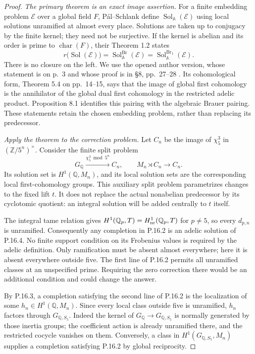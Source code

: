 \begin{proof}
\emph{The primary theorem is an exact image assertion.}
For a finite embedding problem $\mathcal E$ over a global field
$F$, P\'al--Schlank define $\operatorname{Sol}_{\mathbb A}(\mathcal E)$
using local solutions unramified at almost every place.
Solutions are taken up to conjugacy by the finite kernel; they
need not be surjective. If the kernel is abelian and its order
is prime to $\operatorname{char}(F)$, their Theorem 1.2 states
\[
 r\bigl(\operatorname{Sol}(\mathcal E)\bigr)
  =\operatorname{Sol}_{\mathbb A}^{\operatorname{Br}}(\mathcal E)
  =\operatorname{Sol}_{\mathbb A}^{\operatorname{Br}_1}(\mathcal E).
 \tag{P.16.3}
\]
There is no closure on the left. We use the opened author
version, whose statement is on p.~3 and whose proof is in
\S8, pp.~27--28
\citep[Theorem 1.2; \S1, pp.~1--3; \S8, pp.~27--28]{LitPalSchlank2022}.
Its cohomological form, Theorem 5.4 on pp.~14--15, says that
the image of global first cohomology is the annihilator of the
global dual first cohomology in the restricted adelic product.
Proposition 8.1 identifies this pairing with the algebraic
Brauer pairing. These statements retain the chosen embedding
problem, rather than replacing its predecessor.

\emph{Apply the theorem to the correction problem.}
Let $C_n$ be the image of $\chi_5^3$ in
$(\mathbb Z/5^n)^\times$. Consider the finite split problem
\[
 G_{\mathbb Q}\xrightarrow{\chi_5^3\bmod5^n}C_n,\qquad
 M_n\rtimes C_n\longrightarrow C_n .
 \tag{P.16.4}
\]
Its solution set is $H^1(\mathbb Q,M_n)$, and its local
solution sets are the corresponding local first-cohomology
groups. This auxiliary split problem parametrizes changes
to the fixed lift $t$. It does not replace the actual
nonabelian predecessor by its cyclotomic quotient: an integral
solution will be added centrally to $t$ itself.

The integral tame relation gives
$H^1(\mathbb Q_p,T)=H^1_{\rm nr}(\mathbb Q_p,T)$ for
$p\ne5$, so every $d_{p,n}$ is unramified. Consequently any
completion in P.16.2 is an adelic solution of P.16.4. No finite
support condition on its Frobenius values is required by
the adelic definition. Only ramification must be absent
almost everywhere; here it is absent everywhere outside five.
The first line of P.16.2 permits all unramified classes at an
unspecified prime. Requiring the zero correction there would
be an additional condition and could change the answer.

By P.16.3, a completion satisfying the second line of P.16.2
is the localization of some
$h_n\in H^1(\mathbb Q,M_n)$. Since every local class outside
five is unramified, $h_n$ factors through $G_{\mathbb Q,S_5}$.
Indeed the kernel of $G_{\mathbb Q}\to G_{\mathbb Q,S_5}$
is normally generated by those inertia groups; the coefficient
action is already unramified there, and the restricted
cocycle vanishes on them. Conversely, a class in
$H^1(G_{\mathbb Q,S_5},M_n)$ supplies a completion satisfying
P.16.2 by global reciprocity.


\end{proof}
